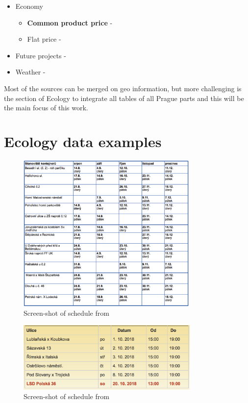 \documentclass{article}
\begin{document}
\begin{itemize}
\begin{itemize}
        \end{itemize}
    \item Economy
        \begin{itemize}
            \item \textbf{Common product price} - \cite{Katalogp90:online}
            \item Flat price - \cite{Sreality94:online,}
        \end{itemize}
    \item Future projects -\cite{tenderarena:online}
    \item Weather - \cite{PortH90:online,Meteosta14:online}
\end{itemize}

Most of the sources can be merged on geo information, but more challenging is the section of Ecology to integrate all tables of all Prague parts and this will be the main focus of this work.


\printbibliography

\appendix

\section{Ecology data examples}
\begin{figure}[h]
    \centering
    \includegraphics[width=0.8\textwidth]{imgs/sc-praha1.png}
    \caption{Screen-shot of schedule from \cite{Harmonog59:online}}
\end{figure}
\begin{figure}[h]
    \centering
    \includegraphics[width=0.8\textwidth]{imgs/sc-praha2.png}
    \caption{Screen-shot of schedule from \cite{McPraha279:online}}
\end{figure}
\end{document}
